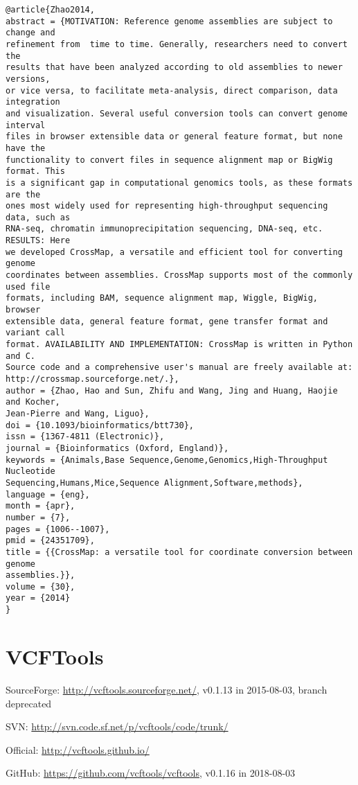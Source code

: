 \documentclass[]{article}
\begin{document}
\begin{verbatim}
@article{Zhao2014,
abstract = {MOTIVATION: Reference genome assemblies are subject to change and
refinement from  time to time. Generally, researchers need to convert the
results that have been analyzed according to old assemblies to newer versions,
or vice versa, to facilitate meta-analysis, direct comparison, data integration
and visualization. Several useful conversion tools can convert genome interval
files in browser extensible data or general feature format, but none have the
functionality to convert files in sequence alignment map or BigWig format. This
is a significant gap in computational genomics tools, as these formats are the
ones most widely used for representing high-throughput sequencing data, such as
RNA-seq, chromatin immunoprecipitation sequencing, DNA-seq, etc. RESULTS: Here
we developed CrossMap, a versatile and efficient tool for converting genome
coordinates between assemblies. CrossMap supports most of the commonly used file
formats, including BAM, sequence alignment map, Wiggle, BigWig, browser
extensible data, general feature format, gene transfer format and variant call
format. AVAILABILITY AND IMPLEMENTATION: CrossMap is written in Python and C.
Source code and a comprehensive user's manual are freely available at:
http://crossmap.sourceforge.net/.},
author = {Zhao, Hao and Sun, Zhifu and Wang, Jing and Huang, Haojie and Kocher,
Jean-Pierre and Wang, Liguo},
doi = {10.1093/bioinformatics/btt730},
issn = {1367-4811 (Electronic)},
journal = {Bioinformatics (Oxford, England)},
keywords = {Animals,Base Sequence,Genome,Genomics,High-Throughput Nucleotide
Sequencing,Humans,Mice,Sequence Alignment,Software,methods},
language = {eng},
month = {apr},
number = {7},
pages = {1006--1007},
pmid = {24351709},
title = {{CrossMap: a versatile tool for coordinate conversion between genome
assemblies.}},
volume = {30},
year = {2014}
}
\end{verbatim}
\section{VCFTools}

SourceForge: \url{http://vcftools.sourceforge.net/}, v0.1.13 in 2015-08-03, branch deprecated

SVN: \url{http://svn.code.sf.net/p/vcftools/code/trunk/}

Official: \url{http://vcftools.github.io/}

GitHub: \url{https://github.com/vcftools/vcftools}, v0.1.16 in 2018-08-03
\end{document}
